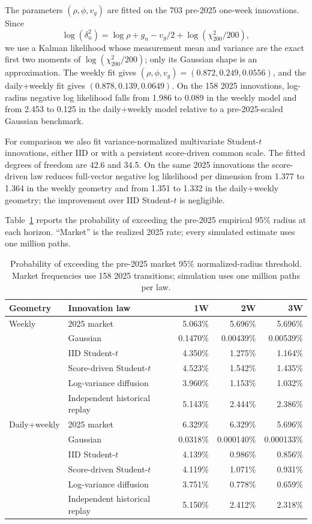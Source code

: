 \documentclass[11pt,a4paper]{article}
\begin{document}
The parameters $(\rho,\phi,v_g)$ are fitted on the 703 pre-2025 one-week
innovations.  Since
\begin{equation}
  \log (\delta_n^2)
  =\log\rho+g_n-v_g/2+\log(\chi^2_{200}/200),
  \label{eq:sv-log-radius}
\end{equation}
we use a Kalman likelihood whose measurement mean and variance are the exact
first two moments of $\log(\chi^2_{200}/200)$; only its Gaussian shape is an
approximation.  The weekly fit gives $(\rho,\phi,v_g)=(0.872,0.249,0.0556)$,
and the daily+weekly fit gives $(0.878,0.139,0.0649)$.  On the 158 2025
innovations, log-radius negative log likelihood falls from 1.986 to 0.089 in
the weekly model and from 2.453 to 0.125 in the daily+weekly model relative to
a pre-2025-scaled Gaussian benchmark.

For comparison we also fit variance-normalized multivariate Student-$t$
innovations, either IID or with a persistent score-driven common scale.  The
fitted degrees of freedom are 42.6 and 34.5.  On the same 2025 innovations the
score-driven law reduces full-vector negative log likelihood per dimension
from 1.377 to 1.364 in the weekly geometry and from 1.351 to 1.332 in the
daily+weekly geometry; the improvement over IID Student-$t$ is negligible.

Table~\ref{tab:tails} reports the probability of exceeding the pre-2025
empirical 95\% radius at each horizon.  ``Market'' is the realized 2025 rate;
every simulated estimate uses one million paths.

\begin{table}[H]
\centering
\small
\begin{tabular}{llrrr}
\toprule
Geometry & Innovation law & 1W & 2W & 3W\\
\midrule
Weekly & 2025 market & 5.063\% & 5.696\% & 5.696\%\\
 & Gaussian & 0.1470\% & 0.00439\% & 0.00539\%\\
 & IID Student-$t$ & 4.350\% & 1.275\% & 1.164\%\\
 & Score-driven Student-$t$ & 4.523\% & 1.542\% & 1.435\%\\
 & Log-variance diffusion & 3.960\% & 1.153\% & 1.032\%\\
 & Independent historical replay & 5.143\% & 2.444\% & 2.386\%\\
\midrule
Daily+weekly & 2025 market & 6.329\% & 6.329\% & 5.696\%\\
 & Gaussian & 0.0318\% & 0.000140\% & 0.000133\%\\
 & IID Student-$t$ & 4.139\% & 0.986\% & 0.856\%\\
 & Score-driven Student-$t$ & 4.119\% & 1.071\% & 0.931\%\\
 & Log-variance diffusion & 3.751\% & 0.778\% & 0.659\%\\
 & Independent historical replay & 5.150\% & 2.412\% & 2.318\%\\
\bottomrule
\end{tabular}
\caption{Probability of exceeding the pre-2025 market 95\% normalized-radius
threshold.  Market frequencies use 158 2025 transitions; simulation uses one
million paths per law.}
\label{tab:tails}
\end{table}
\end{document}
